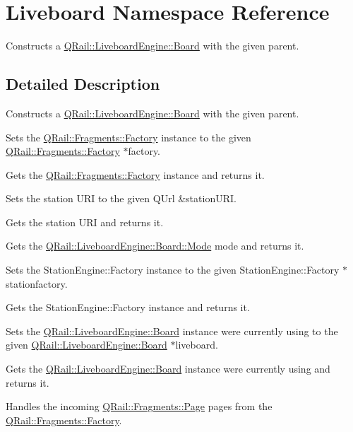 \hypertarget{namespaceLiveboard}{}\section{Liveboard Namespace Reference}
\label{namespaceLiveboard}


Constructs a \mbox{\hyperlink{classQRail_1_1LiveboardEngine_1_1Board}{Q\+Rail\+::\+Liveboard\+Engine\+::\+Board}} with the given parent.  




\subsection{Detailed Description}
Constructs a \mbox{\hyperlink{classQRail_1_1LiveboardEngine_1_1Board}{Q\+Rail\+::\+Liveboard\+Engine\+::\+Board}} with the given parent. 

Sets the \mbox{\hyperlink{classQRail_1_1Fragments_1_1Factory}{Q\+Rail\+::\+Fragments\+::\+Factory}} instance to the given \mbox{\hyperlink{classQRail_1_1Fragments_1_1Factory}{Q\+Rail\+::\+Fragments\+::\+Factory}} $\ast$factory.

Gets the \mbox{\hyperlink{classQRail_1_1Fragments_1_1Factory}{Q\+Rail\+::\+Fragments\+::\+Factory}} instance and returns it.

Sets the station U\+RI to the given Q\+Url \&station\+U\+RI.

Gets the station U\+RI and returns it.

Gets the \mbox{\hyperlink{classQRail_1_1LiveboardEngine_1_1Board_a0ab6d318f405895f62c6e98cb2d86c6e}{Q\+Rail\+::\+Liveboard\+Engine\+::\+Board\+::\+Mode}} mode and returns it.

Sets the Station\+Engine\+::\+Factory instance to the given Station\+Engine\+::\+Factory $\ast$stationfactory.

Gets the Station\+Engine\+::\+Factory instance and returns it.

Sets the \mbox{\hyperlink{classQRail_1_1LiveboardEngine_1_1Board}{Q\+Rail\+::\+Liveboard\+Engine\+::\+Board}} instance we\textquotesingle{}re currently using to the given \mbox{\hyperlink{classQRail_1_1LiveboardEngine_1_1Board}{Q\+Rail\+::\+Liveboard\+Engine\+::\+Board}} $\ast$liveboard.

Gets the \mbox{\hyperlink{classQRail_1_1LiveboardEngine_1_1Board}{Q\+Rail\+::\+Liveboard\+Engine\+::\+Board}} instance we\textquotesingle{}re currently using and returns it.

Handles the incoming \mbox{\hyperlink{classQRail_1_1Fragments_1_1Page}{Q\+Rail\+::\+Fragments\+::\+Page}} pages from the \mbox{\hyperlink{classQRail_1_1Fragments_1_1Factory}{Q\+Rail\+::\+Fragments\+::\+Factory}}.

